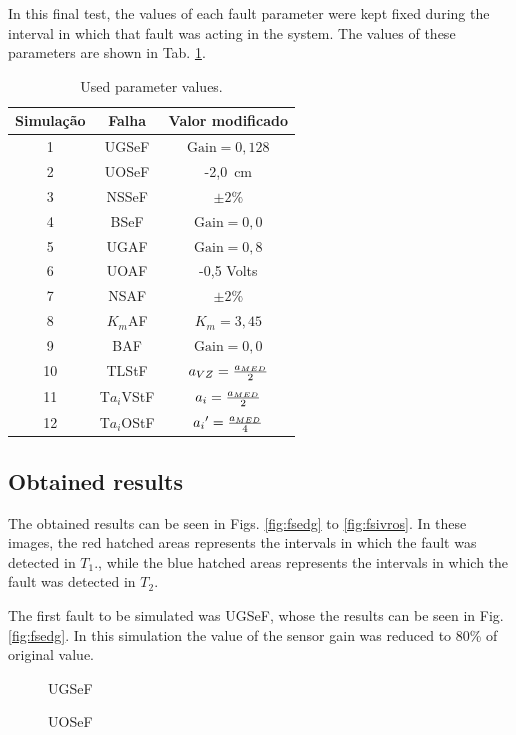\documentclass[10pt,fleqn,a4paper]{article}
\begin{document}
In this final test, the values of each fault parameter were kept fixed during
the interval in which that fault was acting in the system. The values of these
parameters are shown in Tab. \ref{tab:used_val}.

\begin{table}[htb]
\centering
\caption{Used parameter values.}
\label{tab:used_val}
\begin{tabular}{|c|c|c|}
\hline
{\bf Simulação} & {\bf Falha} & {\bf Valor modificado}\\
\hline
1 & UGSeF & $\text{Gain} = 0,128$\\
\hline
2 & UOSeF & -2,0\ cm\\
\hline
3 & NSSeF & $\pm 2\%$\\
\hline
4 & BSeF & $\text{Gain} = 0,0$\\
\hline
5 & UGAF & $\text{Gain} = 0,8$\\
\hline
6 & UOAF & -0,5 Volts\\
\hline
7 & NSAF & $\pm 2\%$\\
\hline
8 & $K_m$AF & $K_m = 3,45$\\ 
\hline
9 & BAF & $\text{Gain} = 0,0$\\
\hline
10 & TLStF & $a_{\tiny VZ} = \frac{a_{\tiny MED}}{2}$\\
\hline
11 & T$a_i$VStF & $a_i = \frac{a_{\tiny MED}}{2}$\\
\hline
12 & T$a_i$OStF & ${a_i}' = \frac{a_{\tiny MED}}{4}$\\
\hline
\end{tabular}
\end{table}

\subsection{Obtained results}
The obtained results can be seen in Figs. \ref{fig:fsedg} to \ref{fig:fsivros}.
In these images, the red hatched areas represents the intervals in which the
fault was detected in $T_1$., while the blue hatched areas represents the
intervals in which the fault was detected in $T_2$.

The first fault to be simulated was UGSeF, whose the results can be seen in Fig.
\ref{fig:fsedg}. In this simulation the value of the sensor gain was reduced to
80\% of original value.

\begin{figure}[htb]
    \begin{minipage}[b]{0.48\linewidth}
        \scalebox{0.65}{}
        \vspace{0.5cm}
        \caption{UGSeF}
        \label{fig:fsedg}
    \end{minipage}
    \hfill
    \begin{minipage}[b]{0.48\linewidth}
        \scalebox{0.65}{}
        \vspace{0.5cm}
        \caption{UOSeF}
        \label{fig:fsedo}
    \end{minipage}
\end{figure}
\end{document}
